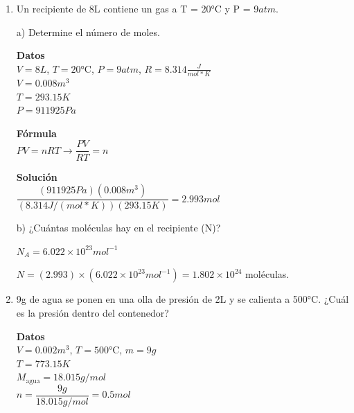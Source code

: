 \documentclass[a4paper, 11pt]{article}
\newcommand{\Pspace}{0.5cm}
\newcommand{\Aspace}{0.2cm}
\begin{document}
\begin{enumerate}
    \vspace{\Pspace}
    \item Un recipiente de 8L contiene un gas a T = 20°C y P = 9$atm$. \par
        \vspace{\Aspace} \par
        a) Determine el número de moles.
        \\ { \color{azul} 
            \textbf{Datos} \\
            $V = 8L$, $T = 20$°C, $P = 9 atm$, $R = 8.314 \frac{J}{mol * K}$ \\
            $V = 0.008 m^{3}$ \\
            $T = 293.15 K$ \\
            $P = 911925 Pa$ \par

            \textbf{Fórmula} \\
            $PV = nRT \rightarrow \dfrac{PV}{RT} = n$ \par

            \textbf{Solución} \\
            $\dfrac{(911925 Pa)(0.008 m^{3})}{(8.314 J/(mol * K))(293.15 K)} = 2.993 mol$
        }

        \vspace{\Aspace} \par
        b) ¿Cuántas moléculas hay en el recipiente (N)?
        \\ { \color{azul} 
            $N_{A} = 6.022 \times 10^{23}mol^{-1}$ \par
            $N = (2.993) \times (6.022 \times 10^{23}mol^{-1}) = 1.802 \times 10^{24}$ moléculas.
        }
 


    \newpage
    \item 9g de agua se ponen en una olla de presión de 2L y se calienta a 500°C. ¿Cuál es la presión dentro del contenedor? \par
        \vspace{\Aspace} \par
        { \color{azul}  
            \textbf{Datos} \\
            $V = 0.002m^{3}$, $T = 500$°C, $m = 9g$ \\
            $T = 773.15 K$ \\
            $M_{\text{agua}} = 18.015 g/mol$ \\
            $n = \dfrac{9g}{18.015 g/mol} = 0.5 mol$ \par

}
\end{enumerate}
\end{document}
